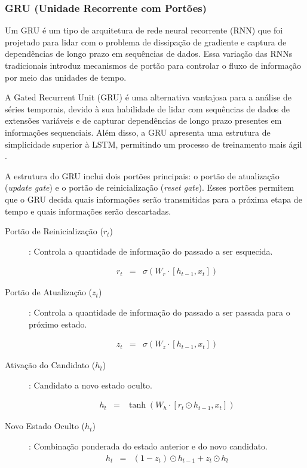 \subsubsection{GRU (Unidade Recorrente com Port\~oes)}


Um GRU é um tipo de arquitetura de rede neural recorrente (RNN) que foi projetado para lidar com o problema de dissipação de gradiente e captura de dependências de longo prazo em sequências de dados. Essa variação das RNNs tradicionais introduz mecanismos de portão para controlar o fluxo de informação por meio das unidades de tempo.

A Gated Recurrent Unit (GRU) é uma alternativa vantajosa para a análise de séries temporais, devido à sua habilidade de lidar com sequências de dados de extensões variáveis e de capturar dependências de longo prazo presentes em informações sequenciais. Além disso, a GRU apresenta uma estrutura de simplicidade superior à LSTM, permitindo um processo de treinamento mais ágil  \cite{mastersthesis53fd58a7}.

A estrutura do GRU inclui dois portões principais: o portão de atualização (\textit{update gate}) e o portão de reinicialização (\textit{reset gate}). Esses portões permitem que o GRU decida quais informações serão transmitidas para a próxima etapa de tempo e quais informações serão descartadas.



\begin{description}
	\item[Portão de Reinicialização (\(r_t\))]: Controla a quantidade de informação do passado a ser esquecida.
	
 \begin{eqnarray}
 	r_t &=& \sigma(W_r \cdot [h_{t-1}, x_t])\label{eq:gru}
 \end{eqnarray} 

\item[Portão de Atualização (\(z_t\))]: Controla a quantidade de informação do passado a ser passada para o próximo estado.

 \begin{eqnarray}
 	z_t &=& \sigma(W_z \cdot [h_{t-1}, x_t])\label{eq:gru1}
 \end{eqnarray}

\item[Ativação do Candidato (\(h\widetilde{_t}\))]: Candidato a novo estado oculto.

\begin{eqnarray}
	h\widetilde{_t} &=& \tanh\left(W_h \cdot [r_t \odot h_{t-1}, x_t]\right)\label{eq:gru2}
\end{eqnarray}

\item[Novo Estado Oculto (\(h_t\))]: Combinação ponderada do estado anterior e do novo candidato.
\begin{eqnarray}
	h_t &=& (1 - z_t) \odot h_{t-1} + z_t \odot h\widetilde{_t}\label{eq:gru3}
\end{eqnarray}
\end{description}

